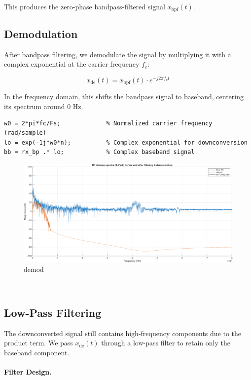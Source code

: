 \documentclass[10pt]{article}
\begin{document}
This produces the zero-phase bandpass-filtered signal $x_{\mathrm{bpf}}(t)$.


\subsection*{Demodulation}

After bandpass filtering, we demodulate the signal by multiplying it with a complex exponential at the carrier frequency $f_c$:

\begin{equation}
x_{\mathrm{de}}(t) = x_{\mathrm{bpf}}(t) \cdot e^{-j 2 \pi f_c t}
\end{equation}

In the frequency domain, this shifts the bandpass signal to baseband, centering its spectrum around $0$ Hz.


\begin{lstlisting}
w0 = 2*pi*fc/Fs;             % Normalized carrier frequency (rad/sample)
lo = exp(-1j*w0*n);          % Complex exponential for downconversion
bb = rx_bp .* lo;            % Complex baseband signal
\end{lstlisting}

\begin{figure}[!h]
	\centering 
		\includegraphics[width = .75\columnwidth]{fig/100_fdomain_demod.png}	
	\caption{demod}
\label{fig:demod}
\end{figure}

---

\subsection*{Low-Pass Filtering}

The downconverted signal still contains high-frequency components due to the product term.  
We pass $x_{\mathrm{de}}(t)$ through a low-pass filter to retain only the baseband component.

\paragraph{Filter Design.}
\end{document}
